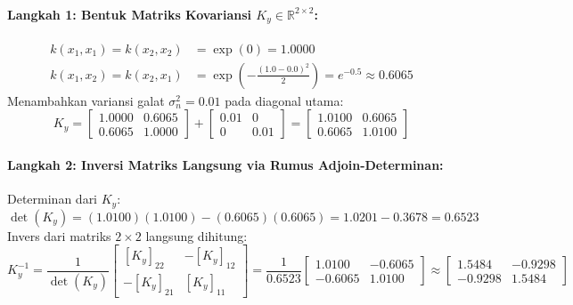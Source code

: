 \documentclass[11pt,a4paper]{article}
\begin{document}
\paragraph{Langkah 1: Bentuk Matriks Kovariansi $K_y \in \mathbb{R}^{2 \times 2}$:}
\begin{align*}
k(x_1, x_1) = k(x_2, x_2) &= \exp(0) = 1.0000 \\
k(x_1, x_2) = k(x_2, x_1) &= \exp\left(-\frac{(1.0 - 0.0)^2}{2}\right) = e^{-0.5} \approx 0.6065
\end{align*}
Menambahkan variansi galat $\sigma_n^2 = 0.01$ pada diagonal utama:
\begin{equation}
K_y = \begin{bmatrix} 1.0000 & 0.6065 \\ 0.6065 & 1.0000 \end{bmatrix} + \begin{bmatrix} 0.01 & 0 \\ 0 & 0.01 \end{bmatrix} = \begin{bmatrix} 1.0100 & 0.6065 \\ 0.6065 & 1.0100 \end{bmatrix}
\end{equation}

\paragraph{Langkah 2: Inversi Matriks Langsung via Rumus Adjoin-Determinan:}
Determinan dari $K_y$:
\begin{equation}
\det(K_y) = (1.0100)(1.0100) - (0.6065)(0.6065) = 1.0201 - 0.3678 = 0.6523
\end{equation}
Invers dari matriks $2 \times 2$ langsung dihitung:
\begin{equation}
K_y^{-1} = \frac{1}{\det(K_y)} \begin{bmatrix} [K_y]_{22} & -[K_y]_{12} \\ -[K_y]_{21} & [K_y]_{11} \end{bmatrix} = \frac{1}{0.6523} \begin{bmatrix} 1.0100 & -0.6065 \\ -0.6065 & 1.0100 \end{bmatrix} \approx \begin{bmatrix} 1.5484 & -0.9298 \\ -0.9298 & 1.5484 \end{bmatrix}
\end{equation}
\end{document}
